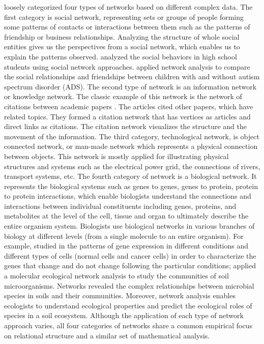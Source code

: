 \citet{newman2003structure} loosely categorized four types of networks based on different complex data. The first category is social network, representing sets or groups of people forming some patterns of contacts or interactions between them such as the patterns of friendship or business relationships. Analyzing the structure of whole social entities gives us the perspectives from a social network, which enables us to explain the patterns observed. \citet{moody2001race} analyzed the social behaviors in high school students using social network approaches. \citep{Kasari2011social} applied network analysis to compare the social relationships and friendships between children with and without autism spectrum disorder (ADS). The second type of network is an information network or knowledge network. The classic example of this network is the network of citations between academic papers \citep{newman2003structure}. The articles cited other papers, which have related topics. They formed a citation network that has vertices as articles and direct links as citations. The citation network visualizes the structure and the movement of the information. The third category, technological network, is object connected network, or man-made network which represents a physical connection between objects. This network is mostly applied for illustrating physical structures and systems such as the electrical power grid, the connections of rivers, transport systems, etc. The fourth category of network is a biological network. It represents the biological systems such as genes to genes, genes to protein, protein to protein interactions, which enable biologists understand the connections and interactions between individual constituents including genes, proteins, and metabolites at the level of the cell, tissue and organ to ultimately describe the entire organism system. Biologists use biological networks in various branches of biology at different levels (from a single molecule to an entire organism). For example, \citet{yang2014gene, barabasi2004network} studied in the patterns of gene expression in different conditions and different types of cells (normal cells and cancer cells) in order to characterize the genes that change and do not change following the particular conditions; \citet{freilich2010large} applied a molecular ecological network analysis to study the communities of soil microorganisms. Networks revealed the complex relationships between microbial species in soils and their communities. Moreover, network analysis enables ecologists to understand ecological properties and predict the ecological roles of species in a soil ecosystem. Although the application of each type of network approach varies, all four categories of networks share a common empirical focus on relational structure and a similar set of mathematical analysis. 

